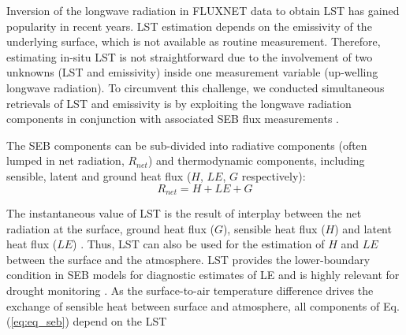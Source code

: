 \documentclass[fleqn,10pt]{wlscirep}
\begin{document}
  Inversion of the longwave radiation in FLUXNET data to obtain LST has gained popularity in recent years. LST estimation depends on the emissivity of the underlying surface\cite{mallick2018bridging}, which is not available as routine measurement. Therefore, estimating in-situ LST is not straightforward due to the involvement of two unknowns (LST and emissivity) inside one measurement variable (up-welling longwave radiation). To circumvent this challenge, we conducted simultaneous retrievals of LST and emissivity is by exploiting the longwave radiation components in conjunction with associated SEB flux measurements \cite{holmes2009land,maes2019potential}.
  
The SEB components can be sub-divided into radiative components (often lumped in net radiation, $R_{net}$) and thermodynamic components, including sensible, latent and ground heat flux ($H$, $LE$, $G$ respectively):
\begin{equation}\label{eq:eq_seb}
R_{net} = H + LE + G 
\end{equation}
  
The instantaneous value of LST is the result of interplay between the net radiation at the surface, ground heat flux ($G$), sensible heat flux ($H$) and latent heat flux ($LE$) \cite{wang2013global}. Thus, LST can also be used for the estimation of $H$ \cite{sun1995relationship} and $LE$ \cite{jacob2001comprehensive} between the surface and the atmosphere. LST provides the lower-boundary condition in SEB models for diagnostic estimates of LE  and is highly relevant for drought monitoring \cite{trebs2021role,mallick2016canopy,mallick2015reintroducing}. As the surface-to-air temperature difference drives the exchange of sensible heat between surface and atmosphere, all components of Eq. (\ref{eq:eq_seb}) depend on the LST
 
\end{document}
